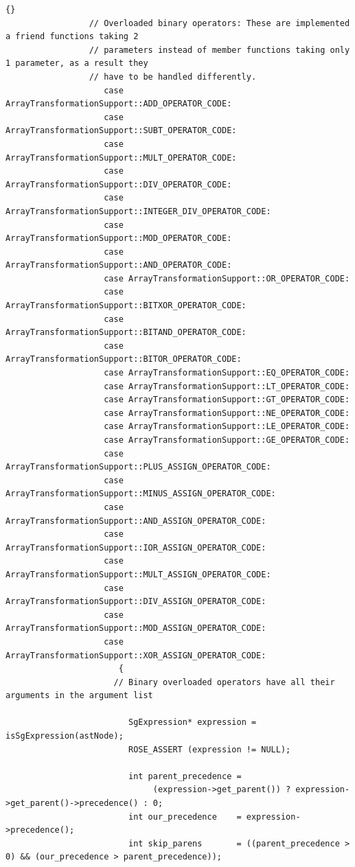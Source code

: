 \documentclass[10pt]{article}
\begin{document}
{\begin{lstlisting}{}
                 // Overloaded binary operators: These are implemented a friend functions taking 2
                 // parameters instead of member functions taking only 1 parameter, as a result they
                 // have to be handled differently.
                    case ArrayTransformationSupport::ADD_OPERATOR_CODE:
                    case ArrayTransformationSupport::SUBT_OPERATOR_CODE:
                    case ArrayTransformationSupport::MULT_OPERATOR_CODE:
                    case ArrayTransformationSupport::DIV_OPERATOR_CODE:
                    case ArrayTransformationSupport::INTEGER_DIV_OPERATOR_CODE:
                    case ArrayTransformationSupport::MOD_OPERATOR_CODE:
                    case ArrayTransformationSupport::AND_OPERATOR_CODE:
                    case ArrayTransformationSupport::OR_OPERATOR_CODE:
                    case ArrayTransformationSupport::BITXOR_OPERATOR_CODE:
                    case ArrayTransformationSupport::BITAND_OPERATOR_CODE:
                    case ArrayTransformationSupport::BITOR_OPERATOR_CODE:
                    case ArrayTransformationSupport::EQ_OPERATOR_CODE:
                    case ArrayTransformationSupport::LT_OPERATOR_CODE:
                    case ArrayTransformationSupport::GT_OPERATOR_CODE:
                    case ArrayTransformationSupport::NE_OPERATOR_CODE:
                    case ArrayTransformationSupport::LE_OPERATOR_CODE:
                    case ArrayTransformationSupport::GE_OPERATOR_CODE:
                    case ArrayTransformationSupport::PLUS_ASSIGN_OPERATOR_CODE:
                    case ArrayTransformationSupport::MINUS_ASSIGN_OPERATOR_CODE:
                    case ArrayTransformationSupport::AND_ASSIGN_OPERATOR_CODE:
                    case ArrayTransformationSupport::IOR_ASSIGN_OPERATOR_CODE:
                    case ArrayTransformationSupport::MULT_ASSIGN_OPERATOR_CODE:
                    case ArrayTransformationSupport::DIV_ASSIGN_OPERATOR_CODE:
                    case ArrayTransformationSupport::MOD_ASSIGN_OPERATOR_CODE:
                    case ArrayTransformationSupport::XOR_ASSIGN_OPERATOR_CODE:
                       {
                      // Binary overloaded operators have all their arguments in the argument list

                         SgExpression* expression = isSgExpression(astNode);
                         ROSE_ASSERT (expression != NULL);

                         int parent_precedence =
                              (expression->get_parent()) ? expression->get_parent()->precedence() : 0;
                         int our_precedence    = expression->precedence();
                         int skip_parens       = ((parent_precedence > 0) && (our_precedence > parent_precedence));


\end{lstlisting}}
\end{document}
